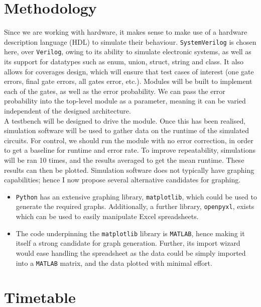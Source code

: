 \documentclass[12pt,a4paper]{article}
\begin{document}
\section{Methodology} \label{sec:meth}
Since we are working with hardware, it makes sense to make use of a hardware description language (HDL) to simulate 
their behaviour. \texttt{SystemVerilog} is chosen here, over \texttt{Verilog}, owing to its ability to simulate 
electronic systems, as well as its support for datatypes such as enum, union, struct, string and class. It also 
allows for coverages design, which will ensure that test cases of interest (one gate errors, final gate errors, all 
gates error, etc.). Modules will be built to implement each of the gates, as well as the error probability. We can 
pass the error probability into the top-level module as a parameter, meaning it can be varied independent of the 
designed architecture. \\

\noindent A testbench will be designed to drive the module. Once this has been realised, simulation software will be 
used to gather data on the runtime of the simulated circuits. For control, we should run the module with no error 
correction, in order to get a baseline for runtime and error rate. To improve repeatability, simulations will be ran 
10 times, and the results averaged to get the mean runtime. These results can then be plotted. Simulation software 
does not typically have graphing capabilities; hence I now propose several alternative candidates for graphing.
\begin{itemize}
    \item \texttt{Python} has an extensive graphing library, \texttt{matplotlib}, which could be used to generate 
    the required graphs. Additionally, a further library, \texttt{openpyxl}, exists which can be used to easily 
    manipulate Excel spreadsheets. 
    \item The code underpinning the \texttt{matplotlib} library is \texttt{MATLAB}, hence making it itself a strong 
    candidate for graph generation. Further, its import wizard would ease handling the spreadsheet as the data could 
    be simply imported into a \texttt{MATLAB} matrix, and the data plotted with minimal effort. 
\end{itemize}


\section{Timetable}
\end{document}
